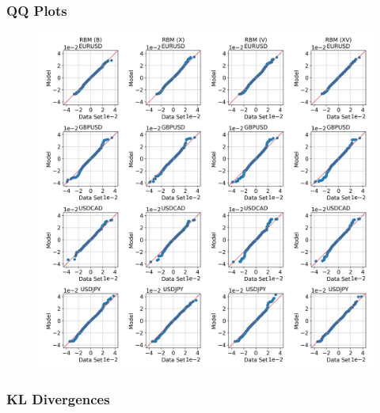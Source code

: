 \documentclass{beamer}
\begin{document}
\begin{frame}
    \frametitle{QQ Plots}
    \begin{figure}
        \includegraphics[width=0.65\linewidth]{rbm/qq.png}
    \end{figure}
\end{frame}

\begin{frame}
    \frametitle{KL Divergences}
    \begin{table}[!htb]
        \centering
        \begin{adjustbox}{max width=\textwidth}
            
        \end{adjustbox}
    \end{table}
\end{frame}


\end{document}
